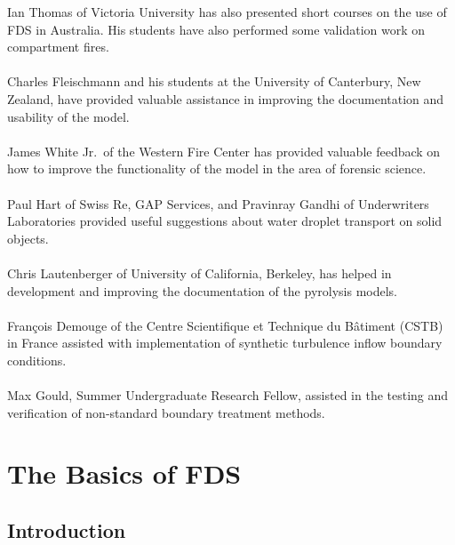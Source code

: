 \documentclass[11pt]{book}
\begin{document}
\noindent Ian Thomas of Victoria University has also presented short courses on the use of FDS in Australia.
His students have also performed some validation work on compartment fires.\\
\\
\noindent Charles Fleischmann and his students at the University of Canterbury, New Zealand, have provided valuable assistance
in improving the documentation and usability of the model.\\
\\
\noindent James White Jr.~of the Western Fire Center has provided valuable feedback on how to
improve the functionality of the model in the area of forensic science.\\
\\
\noindent Paul Hart of Swiss Re, GAP Services, and Pravinray Gandhi of Underwriters Laboratories provided useful suggestions about
water droplet transport on solid objects.\\
\\
\noindent Chris Lautenberger of University of California, Berkeley, has helped in development and improving the documentation of the pyrolysis models.\\
\\
\noindent Fran\c{c}ois Demouge of the Centre Scientifique et Technique du B\^{a}timent (CSTB) in France assisted with implementation of synthetic turbulence inflow boundary conditions.\\
\\
\noindent Max Gould, Summer Undergraduate Research Fellow, assisted in the testing and verification of non-standard boundary treatment methods.\\




\setlength{\cftsecnumwidth}{0.45in}
\setlength{\cftsubsecnumwidth}{0.5in}
\setlength{\cftfignumwidth}{0.45in}
\setlength{\cfttabnumwidth}{0.45in}

\cleardoublepage
\tableofcontents

\cleardoublepage
\listoffigures

\cleardoublepage
\listoftables

\mainmatter



\part{The Basics of FDS}


\chapter{Introduction}
\end{document}
